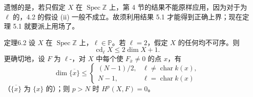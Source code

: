 遗憾的是，若只假定 $X$ 在 $\operatorname{Spec}\mathbb Z$ 上，第 4 节的结果不能原样应用，因为对于为 $\ell$ 的，4.2 的假设 (ii) 一般不成立。故须利用结果 5.1 才能得到正确上界；现在定理 5.1 就要派上用场了。
\begin{SGAresult}{定理}{6.2}
设 $X$ 在 $\operatorname{Spec}\mathbb Z$ 上，$\ell\in\mathbb P$。若 $\ell=2$，假定 $X$ 的任何均不可序。则
\[
 \operatorname{cd}_\ell X\leq2\dim X+1.
\]
更确切地，设 $F$ 为 $\ell$-，对 $X$ 中每个使 $F_{\bar x}\ne0$ 的点 $x$，有
\[
 \dim\overline{\{x\}}\leq
 \begin{cases}
 (N-1)/2,&\ell\ne\operatorname{char}k(x),\\
 N-1,&\ell=\operatorname{char}k(x)
 \end{cases}
\]
（$\overline{\{x\}}$ 为 $\{x\}$ 的）；则 $p>N$ 时 $H^p(X,F)=0$。
\end{SGAresult}
